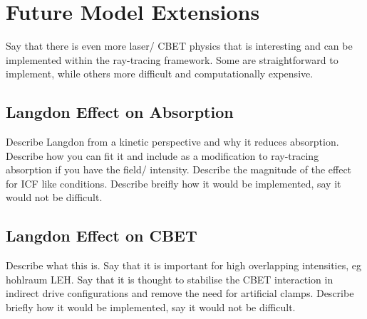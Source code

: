 \iffalse

\section{Future Model Extensions}

Say that there is even more laser/ CBET physics that is interesting and can be implemented within the ray-tracing framework.
Some are straightforward to implement, while others more difficult and computationally expensive.

\subsection{Langdon Effect on Absorption}

Describe Langdon from a kinetic perspective and why it reduces absorption.
Describe how you can fit it and include as a modification to ray-tracing absorption if you have the field/ intensity.
Describe the magnitude of the effect for ICF like conditions.
Describe breifly how it would be implemented, say it would not be difficult.

\subsection{Langdon Effect on CBET}

Describe what this is.
Say that it is important for high overlapping intensities, eg hohlraum LEH.
Say that it is thought to stabilise the CBET interaction in indirect drive configurations and remove the need for artificial clamps.
Describe briefly how it would be implemented, say it would not be difficult.

